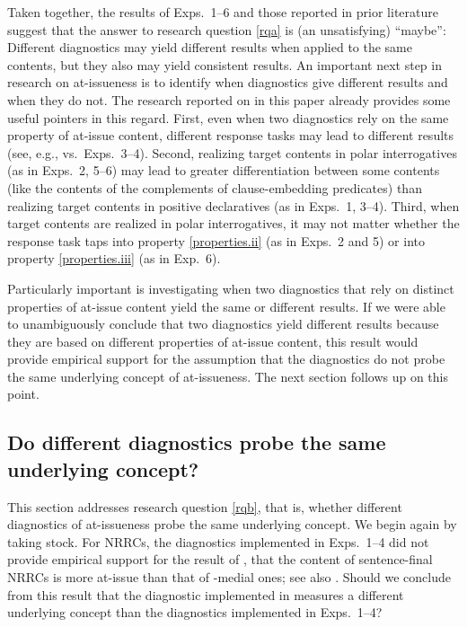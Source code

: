 \documentclass[times,linguex]{glossa}
\begin{document}
Taken together, the results of Exps.~1--6 and those reported in prior literature suggest that the answer to research question \ref{rqa} is (an unsatisfying) ``maybe'': Different diagnostics may yield different results when applied to the same contents, but they also may yield consistent results. An important next step in research on at-issueness is to identify when diagnostics give different results and when they do not. The research reported on in this paper already provides some useful pointers in this regard. First, even when two diagnostics rely on the same property of at-issue content, different response tasks may lead to different results (see, e.g., \citealt[Exp.~2]{syrett_experimental_2015} vs.~Exps.~3--4). Second, realizing target contents in polar interrogatives (as in Exps.~2, 5--6) may lead to greater differentiation between some contents (like the contents of the complements of clause-embedding predicates) than realizing target contents in positive declaratives (as in Exps.~1, 3--4). Third, when target contents are realized in polar interrogatives, it may not matter whether the response task taps into property \ref{properties.ii} (as in Exps.~2 and 5) or into property \ref{properties.iii} (as in Exp.~6).

Particularly important is investigating when two diagnostics that rely on distinct properties of at-issue content yield the same or different results. If we were able to unambiguously conclude that two diagnostics yield different results because they are based on different properties of at-issue content, this result would provide empirical support for the assumption that the diagnostics do not probe the same underlying concept of at-issueness. The next section follows up on this point.

\subsection{Do different diagnostics probe the same underlying concept?}\label{ssec:rqb}

This section addresses research question \ref{rqb}, that is, whether different diagnostics of at-issueness probe the same underlying concept. We begin again by taking stock. For NRRCs, the diagnostics implemented in Exps.~1--4 did not provide empirical support for the result of \citealt[Exp.~2]{syrett_experimental_2015}, that the content of sentence-final NRRCs is more at-issue than that of -medial ones; see also \citealt{snider_anaphoric_2017}. Should we conclude from this result that the diagnostic implemented in \citealt[Exp.~2]{syrett_experimental_2015} measures a different underlying concept than the diagnostics implemented in Exps.~1--4?
\end{document}
